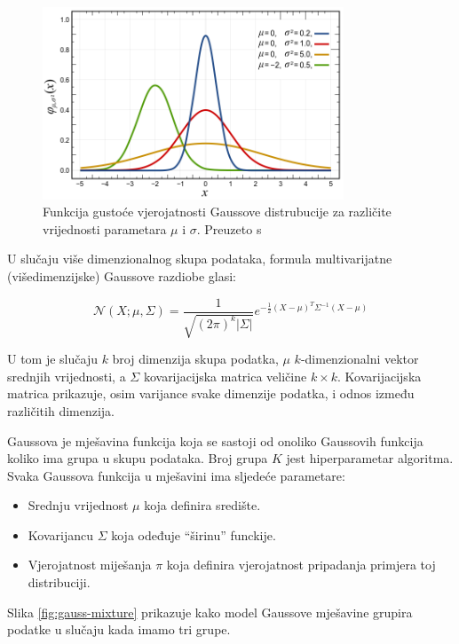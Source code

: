 \documentclass[utf8, diplomski, numeric]{fer}
\begin{document}
\begin{figure}[htb]
\includegraphics[width=0.8\textwidth]{images/gauss1.png}
\centering
\caption{Funkcija gustoće vjerojatnosti Gaussove distrubucije za različite vrijednosti parametara $\mu$ i $\sigma$. Preuzeto s  \cite{normalDistWiki}}
\label{fig:gauss1}
\end{figure}

U slučaju više dimenzionalnog skupa podataka, formula multivarijatne (višedimenzijske) Gaussove razdiobe glasi:

\begin{equation}
\mathcal{N}(X;\mu,\Sigma)  =\frac{1}{\sqrt{(2\pi)^{k}|\Sigma|}}e^{-\frac{1}{2}(X-\mu)^T\Sigma^{-1}(X-\mu)}
\end{equation}

U tom je slučaju $k$ broj dimenzija skupa podatka, $\mu$ $k$-dimenzionalni vektor srednjih vrijednosti, a $\Sigma$ kovarijacijska matrica veličine $k \times k$. Kovarijacijska matrica prikazuje, osim varijance svake dimenzije podatka, i odnos između različitih dimenzija.

Gaussova je mješavina funkcija koja se sastoji od onoliko Gaussovih funkcija koliko ima grupa u skupu podataka. Broj grupa $K$ jest hiperparametar algoritma. Svaka Gaussova funkcija u mješavini ima sljedeće parametare:

\begin{itemize}
\item Srednju vrijednost $\mu$ koja definira središte.
\item Kovarijancu $\Sigma$  koja odeđuje ``širinu'' funckije.
\item Vjerojatnost miješanja $\pi$ koja definira vjerojatnost pripadanja primjera toj distribuciji.
\end{itemize}

Slika \ref{fig:gauss-mixture} prikazuje kako model Gaussove mješavine grupira podatke u slučaju kada imamo tri grupe.
\end{document}
